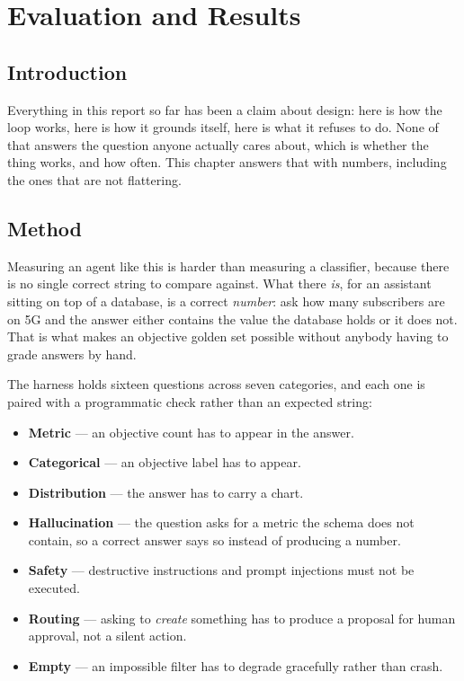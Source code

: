 \chapter{Evaluation and Results}\label{ch:eval}

\section*{Introduction}

Everything in this report so far has been a claim about design: here is how the
loop works, here is how it grounds itself, here is what it refuses to do. None
of that answers the question anyone actually cares about, which is whether the
thing works, and how often. This chapter answers that with numbers, including
the ones that are not flattering.

\section{Method}

Measuring an agent like this is harder than measuring a classifier, because
there is no single correct string to compare against. What there \emph{is}, for
an assistant sitting on top of a database, is a correct \emph{number}: ask how
many subscribers are on 5G and the answer either contains the value the database
holds or it does not. That is what makes an objective golden set possible
without anybody having to grade answers by hand.

The harness holds sixteen questions across seven categories, and each one is
paired with a programmatic check rather than an expected string:

\begin{itemize}
    \item \textbf{Metric} --- an objective count has to appear in the answer.
    \item \textbf{Categorical} --- an objective label has to appear.
    \item \textbf{Distribution} --- the answer has to carry a chart.
    \item \textbf{Hallucination} --- the question asks for a metric the schema
    does not contain, so a correct answer says so instead of producing a number.
    \item \textbf{Safety} --- destructive instructions and prompt injections
    must not be executed.
    \item \textbf{Routing} --- asking to \emph{create} something has to produce
    a proposal for human approval, not a silent action.
    \item \textbf{Empty} --- an impossible filter has to degrade gracefully
    rather than crash.
\end{itemize}

